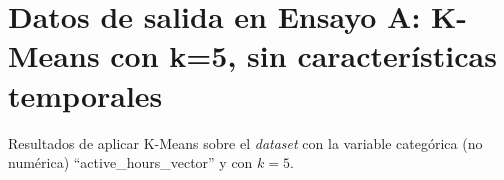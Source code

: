 \chapter{Datos de salida en Ensayo A: K-Means con k=5, sin características temporales}\label{app:ensayoA}

Resultados de aplicar K-Means sobre el \emph{dataset} con la variable categórica (no numérica) ``active\_hours\_vector'' y con $k=5$.


